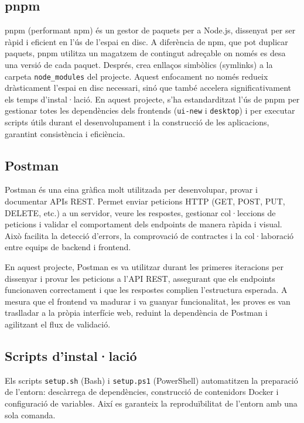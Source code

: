 \subsection*{pnpm}
pnpm (performant npm) és un gestor de paquets per a Node.js, dissenyat per ser ràpid i eficient en l'ús de l'espai en disc. A diferència de npm, que pot duplicar paquets, pnpm utilitza un magatzem de contingut adreçable on només es desa una versió de cada paquet. Després, crea enllaços simbòlics (symlinks) a la carpeta \texttt{node\_modules} del projecte. Aquest enfocament no només redueix dràsticament l'espai en disc necessari, sinó que també accelera significativament els temps d'instal·lació. En aquest projecte, s'ha estandarditzat l'ús de pnpm per gestionar totes les dependències dels frontends (\texttt{ui-new} i \texttt{desktop}) i per executar scripts útils durant el desenvolupament i la construcció de les aplicacions, garantint consistència i eficiència.

\subsection*{Postman}
Postman és una eina gràfica molt utilitzada per desenvolupar, provar i documentar APIs REST. Permet enviar peticions HTTP (GET, POST, PUT, DELETE, etc.) a un servidor, veure les respostes, gestionar col·leccions de peticions i validar el comportament dels endpoints de manera ràpida i visual. Això facilita la detecció d'errors, la comprovació de contractes i la col·laboració entre equips de backend i frontend.

En aquest projecte, Postman es va utilitzar durant les primeres iteracions per dissenyar i provar les peticions a l'API REST, assegurant que els endpoints funcionaven correctament i que les respostes complien l'estructura esperada. A mesura que el frontend va madurar i va guanyar funcionalitat, les proves es van traslladar a la pròpia interfície web, reduint la dependència de Postman i agilitzant el flux de validació.

\subsection*{Scripts d'instal·lació}
Els scripts \texttt{setup.sh} (Bash) i \texttt{setup.ps1} (PowerShell) automatitzen la preparació de l'entorn: descàrrega de dependències, construcció de contenidors Docker i configuració de variables. Així es garanteix la reproduïbilitat de l'entorn amb una sola comanda.

